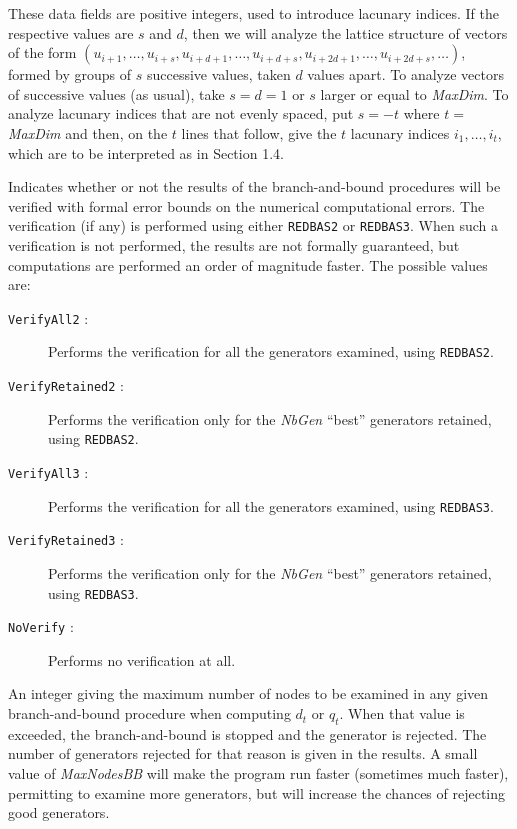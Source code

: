 \begin {description}
  These data fields are positive integers, used to introduce lacunary indices.
  If the respective values are $s$ and $d$, then we will analyze the
  lattice structure of vectors of the form
  $(u_{i+1}, \dots, u_{i+s}, u_{i+d+1},\dots, u_{i+d+s}, u_{i+2d+1},\dots,
  u_{i+2d+s}, \dots)$, formed by groups of $s$ successive values,
  taken $d$ values apart.
  To analyze vectors of successive values (as usual), take $s=d=1$
  or $s$ larger or equal to {\em MaxDim}.
  To analyze lacunary indices that are not evenly spaced,
  put $s = -t$ where {\em $t=$MaxDim\/} and then, on the $t$ lines that
  follow, give the $t$ lacunary indices $i_1,\dots,i_t$, which are to
  be interpreted as in Section 1.4.
%
\item [{\em VerifyBB} :]
  Indicates whether or not the results of the branch-and-bound procedures
  will be verified with formal error bounds on the numerical computational
  errors.  The verification (if any) is performed using either
  {\tt REDBAS2} or {\tt REDBAS3}.
  When such a verification is not performed, the results are not
  formally guaranteed, but computations are performed an order of
  magnitude faster.  The possible values are:
 \begin {description}
 \item [{\tt VerifyAll2} :] Performs the verification for all the generators
   examined, using {\tt REDBAS2}.
 \item [{\tt VerifyRetained2} :] Performs the verification only for the
   {\em NbGen\/} ``best'' generators retained, using {\tt REDBAS2}.
 \item [{\tt VerifyAll3} :] Performs the verification for all the generators
   examined, using {\tt REDBAS3}.
 \item [{\tt VerifyRetained3} :] Performs the verification only for the
   {\em NbGen\/} ``best'' generators retained, using {\tt REDBAS3}.
 \item [{\tt NoVerify} :] Performs no verification at all.
 \end {description}
%
\item [{\em MaxNodesBB} :]
  An integer giving the maximum number of nodes to be examined in any
  given branch-and-bound procedure when computing $d_t$ or $q_t$.
  When that value is exceeded, the branch-and-bound is stopped and the
  generator is rejected.  The number of generators rejected for that
  reason is given in the results.
  A small value of {\em MaxNodesBB} will make the program run faster
  (sometimes much faster), permitting to examine more generators,
  but will increase the chances of rejecting good generators.

\end{description}

